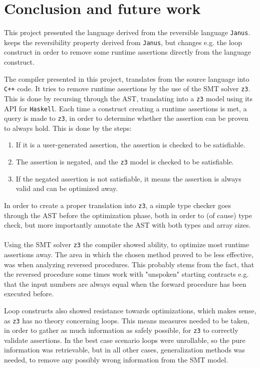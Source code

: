 \section{Conclusion and future work \rr}
This project presented the language \lan derived from the reversible language \texttt{Janus}.
\lan keeps the reversibility property derived from \texttt{Janus}, but changes e.g. the loop
construct in order to remove some runtime assertions directly from the language construct.

The \lan compiler presented in this project, translates from the source language into \texttt{C++}
code. It tries to remove runtime assertions by the use of the SMT solver \texttt{z3}. This is
done by recursing through the AST, translating into a \texttt{z3} model using its API for
\texttt{Haskell}. Each time a construct creating a runtime assertions is met, a query is made to
\texttt{z3}, in order to determine whether the assertion can be proven to always hold. This is
done by the steps:
\begin{enumerate}
      \item If it is a user-generated assertion, the assertion is checked to be satisfiable.
      \item The assertion is negated, and the \texttt{z3} model is checked to be satisfiable.
      \item If the negated assertion is not satisfiable, it means the assertion is always valid
            and can be optimized away.
\end{enumerate}
\noindent
In order to create a proper translation into \texttt{z3}, a simple type checker goes through the
AST before the optimization phase, both in order to (of cause) type check, but more importantly
annotate the AST with both types and array sizes.
\\
\\
Using the SMT solver \texttt{z3} the \lan compiler showed ability, to optimize most runtime
assertions away. The area in which the chosen method proved to be less effective, was when
analyzing reversed procedures. This probably stems from the fact, that the reversed procedure
some times work with "unspoken" starting contracts e.g. that the input numbers are always equal
when the forward procedure has been executed before.

Loop constructs also showed resistance towards optimizations, which makes sense, as \texttt{z3}
has no theory concerning loops. This means measures needed to be taken, in order to gather as much
information as safely possible, for \texttt{z3} to correctly validate assertions. In the best case
scenario loops were unrollable, so the pure information was retrievable, but in all other
cases, generalization methods was needed, to remove any possibly wrong information from the
SMT model.

